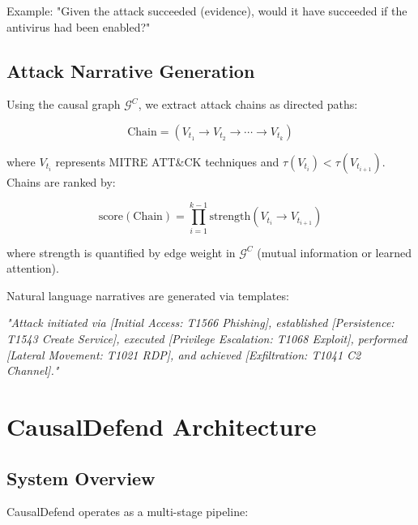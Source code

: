 \documentclass[conference]{IEEEtran}
\begin{document}
Example: "Given the attack succeeded (evidence), would it have succeeded if the antivirus had been enabled?"

\subsection{Attack Narrative Generation}

Using the causal graph $\mathcal{G}^C$, we extract attack chains as directed paths:

\begin{equation}
\text{Chain} = (V_{t_1} \rightarrow V_{t_2} \rightarrow \cdots \rightarrow V_{t_k})
\end{equation}

where $V_{t_i}$ represents MITRE ATT\&CK techniques and $\tau(V_{t_i}) < \tau(V_{t_{i+1}})$. Chains are ranked by:

\begin{equation}
\text{score}(\text{Chain}) = \prod_{i=1}^{k-1} \text{strength}(V_{t_i} \rightarrow V_{t_{i+1}})
\end{equation}

where strength is quantified by edge weight in $\mathcal{G}^C$ (mutual information or learned attention).

Natural language narratives are generated via templates:

\textit{"Attack initiated via [Initial Access: T1566 Phishing], established [Persistence: T1543 Create Service], executed [Privilege Escalation: T1068 Exploit], performed [Lateral Movement: T1021 RDP], and achieved [Exfiltration: T1041 C2 Channel]."}

\section{CausalDefend Architecture}\label{sec:architecture}

\subsection{System Overview}

CausalDefend operates as a multi-stage pipeline:
\end{document}
